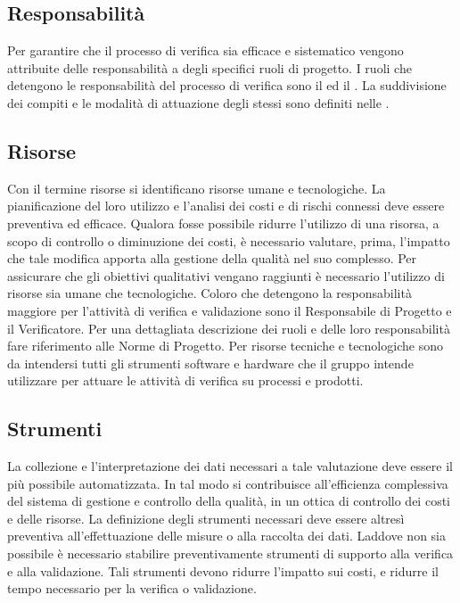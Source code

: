 \documentclass[12pt,a4paper]{article}
\begin{document}
	\subsection{Responsabilità}
	Per garantire che il processo di verifica sia efficace e sistematico vengono attribuite delle
	responsabilità a degli specifici ruoli di progetto.
	I ruoli che detengono le responsabilità del processo di verifica sono il \PM{} ed il \VR{}. La suddivisione dei compiti e le modalità di attuazione degli
	stessi sono definiti nelle \NdP{}.
	
	\subsection{Risorse}\label{risorse}
	Con il termine risorse si identificano risorse umane e tecnologiche. La pianificazione del loro utilizzo e l'analisi dei costi e di rischi connessi deve essere preventiva ed efficace. Qualora fosse possibile ridurre l'utilizzo di una risorsa, a scopo di controllo o diminuzione dei costi, è necessario valutare, prima, l'impatto che tale modifica apporta alla gestione della qualità nel suo complesso.
	Per assicurare che gli obiettivi qualitativi vengano raggiunti è necessario l'utilizzo di
	risorse sia umane che tecnologiche. Coloro che detengono la responsabilità maggiore
	per l'attività di verifica e validazione sono il Responsabile di Progetto e il Verificatore.
	Per una dettagliata descrizione dei ruoli e delle loro responsabilità fare riferimento alle
	Norme di Progetto.
	Per risorse tecniche e tecnologiche sono da intendersi tutti gli strumenti software e hardware che il gruppo intende utilizzare per attuare le attività di verifica su processi
	e prodotti. 
	
	\subsection{Strumenti}

	La collezione e l'interpretazione dei dati necessari a tale valutazione deve essere il più possibile automatizzata. In tal modo si contribuisce all'efficienza complessiva del sistema di gestione e controllo della qualità, in un ottica di controllo dei costi e delle risorse. La definizione degli strumenti necessari deve essere altresì preventiva all'effettuazione delle misure o alla raccolta dei dati.
	Laddove non sia possibile è necessario stabilire preventivamente strumenti di supporto alla verifica e alla validazione. Tali strumenti devono ridurre l'impatto sui costi, e ridurre il tempo necessario per la verifica o validazione. 
	
\end{document}

